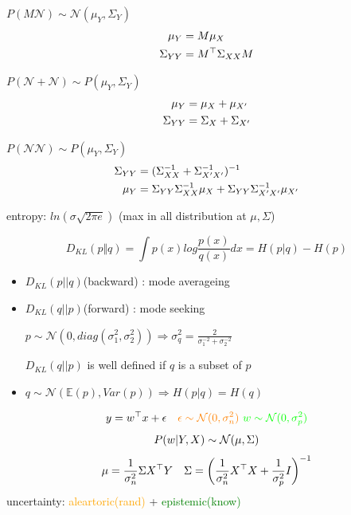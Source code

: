 \documentclass[landscape,a0paper,fontscale=0.285]{baposter} %
\newcommand{\compresslist}{ %
\setlength{\itemsep}{1pt}
\setlength{\parskip}{0pt}
\setlength{\parsep}{0pt}
}
\begin{document}
\begin{poster}
{$P(M \mathcal N)\sim \mathcal N(\mu_Y, \Sigma_Y)$
\vspace{-0.3cm}
$$\vspace{-0.2cm}
\begin{aligned}
\mu_Y &= M\mu_X\\
\Sigma_{YY} &= M^\top\Sigma_{XX}M
\end{aligned}
$$

$P(\mathcal N + \mathcal N) \sim P(\mu_{Y}, \Sigma_Y)$
\vspace{-0.3cm}
$$\vspace{-0.2cm}
\begin{aligned}
\mu_{Y} &= \mu_X + \mu_{X'}\\
\Sigma_{YY} &= \Sigma_{X} + \Sigma_{X'}
\end{aligned}
$$

$P(\mathcal N \mathcal N) \sim P(\mu_{Y}, \Sigma_Y)$
\vspace{-0.3cm}
$$\vspace{-0.2cm}
\begin{aligned}
\Sigma_{YY}&= (\Sigma_{XX}^{-1}+\Sigma_{X'X'}^{-1})^{-1}
\\
\mu_{Y} &= \Sigma_{YY}\Sigma_{XX}^{-1}\mu_X + \Sigma_{YY}\Sigma_{X'X'}^{-1}\mu_{X'}
\end{aligned}
$$

entropy: $ln(\sigma\sqrt{2\pi e})$ (max in all distribution at $\mu,\Sigma$)

\colorbox[HTML]{CCFFFF}{} 
\vspace{-0.3cm}
$$
D_{KL}(p\Vert q) = \int  p(x)log\frac{p(x)}{q(x)}dx = H(p\vert q) - H(p)
$$
\begin{itemize}\compresslist
    \item $D_{KL}(p||q)$(backward) : mode averageing 
    \item $D_{KL}(q||p)$(forward) : mode seeking
    
    $p\sim\mathcal N(0,diag(\sigma_1^2,\sigma_2^2))\Rightarrow\sigma_q^2 = \frac{2}{\sigma_1^{-2}+\sigma_2^{-2}}$
    
    $D_{KL}(q||p)$ is well defined if $q$ is a subset of $p$
    \item $q\sim \mathcal N(\mathbb E(p),Var(p)) \Rightarrow H(p\vert q)=H(q)$
\end{itemize}


\colorbox[HTML]{CCFFFF}{}
\vspace{-0.3cm}
$$\vspace{-0.2cm}
y = w^\top x + \epsilon\quad 
\textcolor{orange}{\epsilon\sim \mathcal N(0,\sigma_n^2)}
~
\textcolor{green}{w\sim\mathcal N(0,\sigma_p^2)}
$$
$$\vspace{-0.2cm}
P(w|Y,X) \sim \mathcal N(\mu,\Sigma)
$$
$$\vspace{-0.2cm}
\mu = \frac{1}{\sigma_n^2}\Sigma X^\top Y \quad
\Sigma = \left(\frac{1}{\sigma_n^2}X^\top X + \frac{1}{\sigma_p^2}I\right)^{-1}
$$
uncertainty: \textcolor{orange}{aleartoric(rand)} + \textcolor{green}{epistemic(know)}

}
\end{poster}
\end{document}
